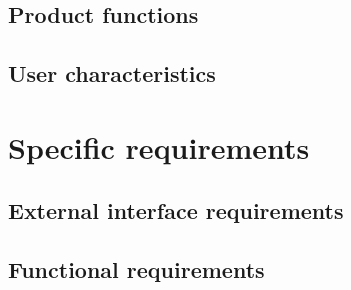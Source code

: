 \documentclass[12pt, a4paper]{report}
\begin{document}
%

\section{Product functions}


\section{User characteristics}


%

%

%

\chapter{Specific requirements}
\label{ch:requirements}

\section{External interface requirements}


\section{Functional requirements}


%
\end{document}
